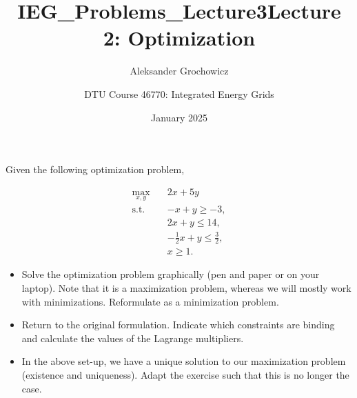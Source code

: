 \documentclass[10pt]{article}
\title{IEG_Problems_Lecture3}
\author{Aleksander Grochowicz}
\date{January 2025}
\newenvironment{problem}[2][Problem]{\begin{trivlist}
\item[\hskip \labelsep {\bfseries #1}\hskip \labelsep {\bfseries #2.}]}{\end{trivlist}}
\begin{document}
 
\title{\textbf{Lecture 2: Optimization}}
\author{
DTU Course 46770: Integrated Energy Grids }
\maketitle
\begin{problem}{2.1}

Given the following optimization problem,


\begin{align*}
	\max_{x,y} \quad & 2x + 5y \\
	\text{s.t.} \quad & -x + y \geq -3, \\
	& 2x + y \leq 14, \\
	& -\frac{1}{2}x + y \leq \frac{3}{2}, \\
	& x \geq 1.
\end{align*}



\begin{itemize}
\item[a)] Solve the optimization problem graphically (pen and paper or on your laptop). Note that it is a maximization problem, whereas we will mostly work with minimizations. Reformulate as a minimization problem.
\item[b)] Return to the original formulation. Indicate which constraints are binding and calculate the values of the Lagrange multipliers.
\item[c)] In the above set-up, we have a unique solution to our maximization problem (existence and uniqueness). Adapt the exercise such that this is no longer the case.
\end{itemize}
\end{problem}

\
\end{document}

